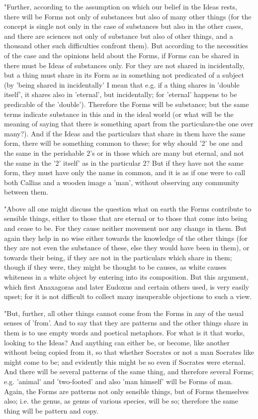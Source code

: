 "Further, according to the assumption on which our belief in the Ideas
rests, there will be Forms not only of substances but also of many
other things (for the concept is single not only in the case of substances
but also in the other cases, and there are sciences not only of substance
but also of other things, and a thousand other such difficulties confront
them). But according to the necessities of the case and the opinions
held about the Forms, if Forms can be shared in there must be Ideas
of substances only. For they are not shared in incidentally, but a
thing must share in its Form as in something not predicated of a subject
(by 'being shared in incidentally' I mean that e.g. if a thing shares
in 'double itself', it shares also in 'eternal', but incidentally;
for 'eternal' happens to be predicable of the 'double'). Therefore
the Forms will be substance; but the same terms indicate substance
in this and in the ideal world (or what will be the meaning of saying
that there is something apart from the particulars-the one over many?).
And if the Ideas and the particulars that share in them have the same
form, there will be something common to these; for why should '2'
be one and the same in the perishable 2's or in those which are many
but eternal, and not the same in the '2' itself' as in the particular
2? But if they have not the same form, they must have only the name
in common, and it is as if one were to call both Callias and a wooden
image a 'man', without observing any community between them.

"Above all one might discuss the question what on earth the Forms
contribute to sensible things, either to those that are eternal or
to those that come into being and cease to be. For they cause neither
movement nor any change in them. But again they help in no wise either
towards the knowledge of the other things (for they are not even the
substance of these, else they would have been in them), or towards
their being, if they are not in the particulars which share in them;
though if they were, they might be thought to be causes, as white
causes whiteness in a white object by entering into its composition.
But this argument, which first Anaxagoras and later Eudoxus and certain
others used, is very easily upset; for it is not difficult to collect
many insuperable objections to such a view. 

"But, further, all other things cannot come from the Forms in any
of the usual senses of 'from'. And to say that they are patterns and
the other things share in them is to use empty words and poetical
metaphors. For what is it that works, looking to the Ideas? And anything
can either be, or become, like another without being copied from it,
so that whether Socrates or not a man Socrates like might come to
be; and evidently this might be so even if Socrates were eternal.
And there will be several patterns of the same thing, and therefore
several Forms; e.g. 'animal' and 'two-footed' and also 'man himself'
will be Forms of man. Again, the Forms are patterns not only sensible
things, but of Forms themselves also; i.e. the genus, as genus of
various species, will be so; therefore the same thing will be pattern
and copy. 


